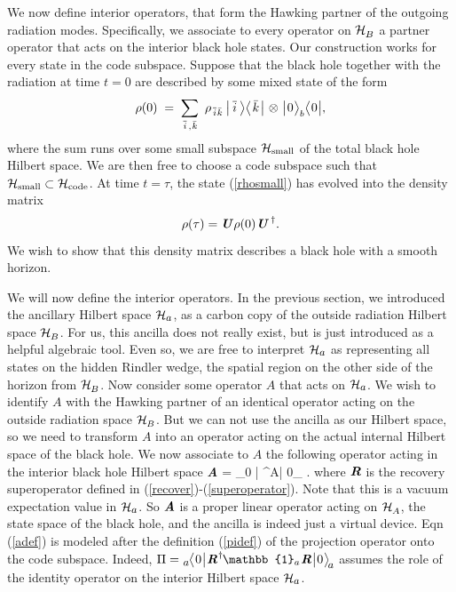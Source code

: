 \documentclass[12pt]{article}%
\def\spc{\hspace{.5pt}}
\def\be{\begin{equation}}
\def\ee{\end{equation}}
\begin{document}
We now define interior operators, that form the Hawking partner of the outgoing radiation modes. Specifically,
we associate to every operator on ${\cal H}_\BB$ a partner operator that acts  
on the interior black hole states. Our construction works for every state in the code subspace. 
Suppose that the black hole together with the radiation at time $t=0$ are described by some mixed state of the form
 \be
 \label{rhosmall}
 \rho(0)\; = \; \sum_{\ibar,  \kbar} \ \rho_{\ibar\!\kbar} \, \bigl| \spc \ibar \spc \ra \la \spc \kbar \spc \bigl|\   \otimes\ \bigl|\spc 0\spc \ra_\bB \la \spc 0 \spc\bigr|,
 \ee
 where the sum runs over some small subspace ${\cal H}_{\rm small}$ of the total black hole Hilbert space. We are then free to choose a code subspace 
such that ${\cal H}_{\rm small} \subset {\cal H}_{\rm code}$.  At time $t = \tau$, the state (\ref{rhosmall}) has evolved into the density matrix 
 \be
 \label{rhotau}
 \rho(\tau) = \uU \rho(0)  \spc \uU^{\, \dag}.
 \ee
 We wish to show that this density matrix describes a black hole with a smooth horizon.
 
 \def\bfA{ \textit{\textbf A}}
 
We will now define the interior operators. In the previous section, we introduced the ancillary Hilbert space ${\cal H}_\aaaa$, as a carbon copy of the
outside radiation Hilbert space ${\cal H}_\BB$. 
For us, this ancilla does not really exist, but is just introduced as a helpful algebraic tool. Even so, we are
free to interpret ${\cal H}_\aaaa$ as representing all states on the hidden Rindler wedge, the spatial region on the other side of the 
horizon from ${\cal H}_\BB$. Now
consider some operator $A$ that acts on ${\cal H}_\aaaa$. We wish to identify $A$ with the Hawking partner of an identical operator
acting on the outside radiation space ${\cal H}_\BB$. But we can not use the ancilla as our Hilbert space, so we need to transform $A$ into an operator
acting on the actual internal Hilbert space of the black hole.
We now associate to $A$ the following operator acting in the interior black hole
Hilbert space 
\bea
\label{adef}
 \textit{\textbf A} = \spc {}_\aaaa\nspc\la \spc 0 \spc \bigl| \smpc \rR^{\spc \dag}\nspc A\spc \rR\spc  \bigl| \spc 0\spc \ra_{\! \aaaa}.
 \eea
where ${\textit{\textbf{R}\!\,}}$ is the recovery superoperator defined in (\ref{recover})-(\ref{superoperator}).
 Note that this is a vacuum expectation value in ${\cal H}_\aaaa$. So  $\textit{\textbf A}$ is a proper linear operator acting on ${\cal H}_\AA$, 
 the state space of the black hole, and the ancilla is indeed just a virtual device.
Eqn (\ref{adef}) is modeled after the definition (\ref{pidef}) of the projection operator onto the 
 code subspace. Indeed,  $\Pi = \spc \raisebox{-.5pt}{${}_\aaaa$}\nspc  \la \spc 0 \spc \bigl| \smpc \rR^{\spc \dag}\nspc \mathbb{1}_a \spc \rR\spc  \bigl| \spc 0\spc \ra_{\! \aaaa}$ assumes the role of the identity operator on the interior Hilbert space ${\cal H}_\aaaa$.
 
\end{document}
